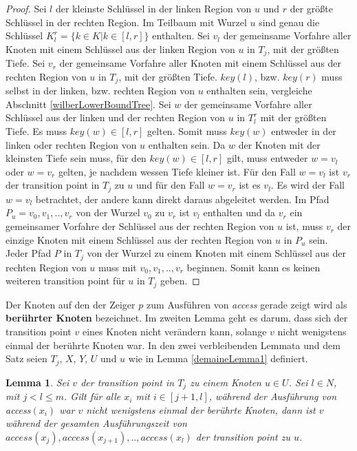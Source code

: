 \documentclass[a4paper,12pt]{article}
\newtheorem{Lemma}{Lemma}[section]
\begin{document}
\begin{proof}
	Sei $l$ der kleinste Schlüssel in der linken Region von $u$ und $r$ der größte Schlüssel in der rechten Region. Im Teilbaum mit Wurzel $u$ sind genau die Schlüssel $K^r_l = \{k \in K \vert k \in \left[l,r\right]\}$ enthalten. Sei $v_l$ der gemeinsame Vorfahre aller Knoten mit einem Schlüssel aus der linken Region von $u$ in $T_j$, mit der größten Tiefe. Sei $v_r$ der gemeinsame Vorfahre aller Knoten mit einem Schlüssel aus der rechten Region von $u$ in $T_j$, mit der größten Tiefe. $\mathit{key\left(l\right)}$, bzw. $\mathit{key\left(r\right)}$ muss selbst in der linken, bzw. rechten Region von $u$ enthalten sein, vergleiche Abschnitt \ref{wilberLowerBoundTree}. Sei $w$ der gemeinsame Vorfahre aller Schlüssel aus der linken und der rechten Region von $u$ in $T^r_l$ mit der größten Tiefe. Es muss $\mathit{key}\left(w\right) \in \left[l,r\right]$ gelten. Somit muss  $\mathit{key}\left(w\right)$ entweder in der linken oder rechten Region von $u$ enthalten sein. Da $w$ der Knoten mit der kleinsten Tiefe sein muss, für den  $\mathit{key\left(w\right)} \in \left[l,r\right]$  gilt, muss entweder $w = v_l$ oder $w = v_r$ gelten, je nachdem wessen Tiefe kleiner ist. Für den Fall $w = v_l$ ist $v_r$ der transition point in $T_j$ zu $u$ und für den Fall $w = v_r$ ist es $v_l$.
	Es wird der Fall $w = v_l$ betrachtet, der andere kann direkt daraus abgeleitet werden. Im Pfad $P_u = v_0,v_1,..,v_r$ von der Wurzel $v_0$ zu $v_r$ ist $v_l$ enthalten und da $v_r$ ein gemeinsamer Vorfahre der Schlüssel aus der rechten Region von $u$ ist, muss $v_r$ der einzige Knoten mit einem Schlüssel aus der rechten Region von $u$ in $P_u$ sein. Jeder Pfad $P$ in $T_j$ von der Wurzel zu einem Knoten mit einem Schlüssel aus der rechten Region von $u$ muss mit $v_0,v_1,..,v_r$ beginnen. Somit kann es keinen weiteren transition point für $u$ in $T_j$ geben. 
	
\end{proof}
\noindent Der Knoten auf den der Zeiger $p$ zum Ausführen von \textit{access} gerade zeigt wird als \textbf{berührter Knoten} bezeichnet.
Im zweiten Lemma geht es darum, dass sich der transition point $v$ eines Knoten nicht verändern kann, solange $v$ nicht wenigstens einmal der berührte Knoten war. In den zwei verbleibenden Lemmata und dem Satz seien  $T_j$, $X$, $Y$, $U$ und $u$ wie in  Lemma \ref{demaineLemma1} definiert. 



\begin{Lemma} \label{demaineLemma2} \label{lemmaDemaine2}
 Sei $v$ der transition point in $T_j$ zu einem Knoten $u \in U$.  Sei  \mbox{$l \in \mathit{N}$}, mit \mbox{$j < l \leq m$}. Gilt für alle $x_i$ mit $i \in \left[j + 1,l\right]$, während der Ausführung von \textit{access}$\left(x_i\right)$ war  $v$  nicht wenigstens einmal der berührte Knoten, dann ist $v$ während der gesamten Ausführungszeit von\\ $\textit{access}\left(x_j\right),\textit{access}\left(x_{j+1}\right),..,\textit{access}\left(x_l\right)$ der transition point zu $u$. 
\end{Lemma}
\end{document}
